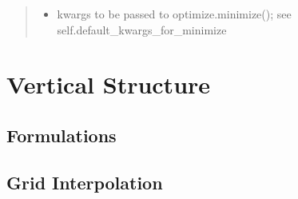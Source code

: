 \documentclass[a4paper,11pt,english]{sphinxmanual}
\begin{document}
\begin{fulllineitems}
\begin{fulllineitems}
\begin{quote}
\begin{description}
\begin{itemize}
\item {} 
\sphinxAtStartPar
{} \textendash{} kwargs to be passed to
optimize.minimize();
see self.default\_kwargs\_for\_minimize

\end{itemize}

\end{description}\end{quote}

\end{fulllineitems}


\begin{fulllineitems}
\label{\detokenize{x22:disk_model.DiskFitting.mcmc_fit}}
\pysigstartsignatures
\pysiglinewithargsret
{}
{\sphinxparamcomma {}}
{}
\pysigstopsignatures
\end{fulllineitems}


\begin{fulllineitems}
\label{\detokenize{x22:disk_model.DiskFitting.set_cosI}}
\pysigstartsignatures
\pysiglinewithargsret
{}
{}
{}
\pysigstopsignatures
\end{fulllineitems}


\end{fulllineitems}


\sphinxstepscope


\chapter{Vertical Structure}
\label{\detokenize{vertical:vertical-structure}}\label{\detokenize{vertical::doc}}

\section{Formulations}
\label{\detokenize{vertical:formulations}}

\section{Grid Interpolation}
\label{\detokenize{vertical:grid-interpolation}}
\end{document}
